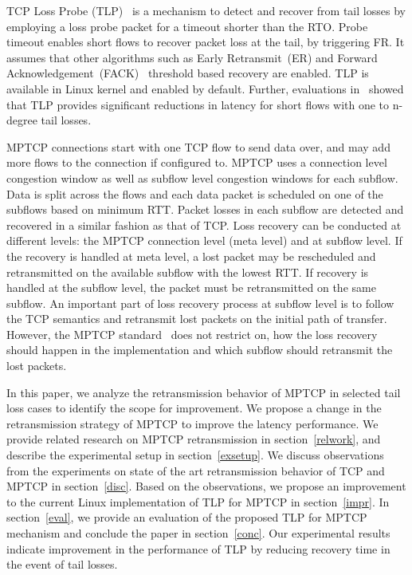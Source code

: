 \documentclass[10pt,conference]{IEEEtran}
\begin{document}
TCP Loss Probe (TLP)~\cite{Flach:2013} is a mechanism to detect and recover from tail losses by employing a loss probe packet for a timeout shorter than the RTO. Probe timeout enables short flows to recover packet loss at the tail, by triggering FR. It assumes that other algorithms such as Early Retransmit~(ER)\cite{rfc5827} and Forward Acknowledgement~(FACK)~\cite{FACK} threshold based recovery are enabled. TLP is available in Linux kernel and enabled by default. Further, evaluations in~\cite{Rajiullah:2015} showed that TLP provides significant reductions in latency for short flows with one to n-degree tail losses. 

 MPTCP connections start with one TCP flow to send data over, and may add more flows to the connection if configured to. MPTCP uses a connection level congestion window as well as subflow level congestion windows for each subflow. Data is split across the flows and each data packet is scheduled on one of the subflows based on minimum RTT. Packet losses in each subflow are detected and recovered in a similar fashion as that of TCP. Loss recovery can be conducted at different levels: the MPTCP connection level (meta level) and at subflow level. If the recovery is handled at meta level, a lost packet may be rescheduled and retransmitted on the available subflow with the lowest RTT. If recovery is handled at the subflow level, the packet must be retransmitted on the same subflow. An important part of loss recovery process at subflow level is to follow the TCP semantics and retransmit lost packets on the initial path of transfer. However, the MPTCP standard~\cite{rfc6824} does not restrict on, how the loss recovery should happen in the implementation and which subflow should retransmit the lost packets.


In this paper, we analyze the retransmission behavior of MPTCP in selected tail loss cases to identify the scope for improvement. We propose a change in the retransmission strategy of MPTCP to improve the latency performance. We provide related research on MPTCP retransmission in section~\ref{relwork}, and describe the experimental setup in section~\ref{exsetup}. We discuss observations from the experiments on state of the art retransmission behavior of TCP and MPTCP in section~\ref{disc}. Based on the observations, we propose an improvement to the current Linux implementation of TLP for MPTCP in section~\ref{impr}. In section~\ref{eval}, we provide an evaluation of the proposed TLP for MPTCP mechanism and conclude the paper in section~\ref{conc}. Our experimental results indicate improvement in the performance of TLP by reducing recovery time in the event of tail losses.
 
\end{document}
